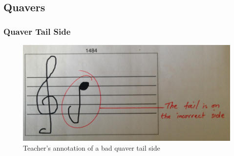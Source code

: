 \subsection{Quavers}

\subsubsection{Quaver Tail Side}

\begin{figure}[H]
  \includegraphics[width=\linewidth]{gfx/photos/teacher-bad-quavertail-side.jpg}
  \caption{Teacher's annotation of a bad quaver tail side}
  \label{fig:teacher-example-quaver-wrong-side}
\end{figure}